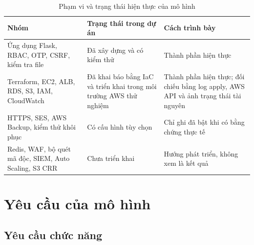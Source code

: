 \begin{table}[htbp]
    \centering
    \small
    \caption{Phạm vi và trạng thái hiện thực của mô hình}
    \label{tab:phamvi-hienthuc}

    \begin{tabularx}{\textwidth}{
        @{}
        >{\raggedright\arraybackslash}X
        >{\raggedright\arraybackslash}X
        >{\raggedright\arraybackslash}X
        @{}
    }
        \toprule
        \textbf{Nhóm}
        & \textbf{Trạng thái trong dự án}
        & \textbf{Cách trình bày} \\
        \midrule

        Ứng dụng Flask, RBAC, OTP, CSRF, kiểm tra file
        & Đã xây dựng và có kiểm thử
        & Thành phần hiện thực \\
        \addlinespace

        Terraform, EC2, ALB, RDS, S3, IAM, CloudWatch
        & Đã khai báo bằng IaC và triển khai trong
          môi trường AWS thử nghiệm
        & Thành phần hiện thực; đối chiếu bằng log apply,
          AWS API và ảnh trạng thái tài nguyên \\
        \addlinespace

        HTTPS, SES, AWS Backup, kiểm thử khôi phục
        & Có cấu hình tùy chọn
        & Chỉ ghi đã bật khi có bằng chứng thực tế \\
        \addlinespace

        Redis, WAF, bộ quét mã độc, SIEM,
        Auto Scaling, S3 CRR
        & Chưa triển khai
        & Hướng phát triển, không xem là kết quả \\

        \bottomrule
    \end{tabularx}
\end{table}

\section{Yêu cầu của mô hình}

\subsection{Yêu cầu chức năng}

